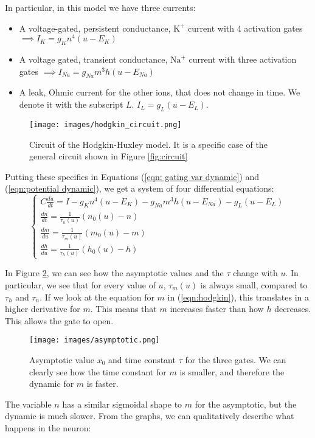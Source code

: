 \documentclass[oneside]{book}
\theoremstyle{definition}
\theoremstyle{plain}
\begin{document}
In particular, in this model we have three currents:
\begin{itemize}
    \item A voltage-gated, persistent conductance, $\mathrm{K}^+$ current with 4 activation gates $\implies I_K= g_K n^4 (u-E_K)$
    \item A voltage gated, transient conductance, $\mathrm{Na}^+$ current with three activation gates 
    $\implies I_{Na} =g_{Na}m^3h(u-E_{Na})$
    \item A leak, Ohmic current for the other ions, that does not change in time. We denote it with the subscript $L$. $I_L=g_L(u-E_L)$.
\end{itemize}
\begin{figure}
    \centering
    \texttt{[image: images/hodgkin\_circuit.png]}
    \caption{Circuit of the Hodgkin-Huxley model. It is a specific case of the general circuit shown in Figure \ref{fig:circuit}}
    \label{fig:hodgkin-circuit}
\end{figure}
Putting these specifics in Equations (\ref{eqn: gating var dynamic}) and (\ref{eqn:potential dynamic}), we get a system of four differential equations:
\begin{equation}\label{eqn:hodgkin}
    \begin{cases}
        C \frac{du}{dt} = I- g_{K}n^4(u- E_K) -g_{Na} m^3 h(u-E_{Na})- g_L(u-E_L) \\
        \frac{dn}{dt} = \frac{1}{\tau_n(u)} (n_0(u)- n)\\
        \frac{dm}{du} =\frac{1}{\tau_m({u})}(m_0(u) - m)\\
        \frac{dh}{du} =\frac{1}{\tau_{h}(u)}(h_0(u)-h)
    \end{cases}
\end{equation}

In Figure \ref{fig:asymptotic}, we can see how the asymptotic values and the $\tau$ change with $u$. In particular, we see that for every value of $u$, $\tau_m(u)$ is always small, compared to $\tau_h$ and $\tau_n$. If we look at the equation for $m$ in (\ref{eqn:hodgkin}), this translates in a higher derivative for $m$. This means that $m$ increases faster than how $h$ decreases. This allows the gate to open.
\begin{figure}
    \centering
    \texttt{[image: images/asymptotic.png]}
    \caption{Asymptotic value $x_0$ and time constant $\tau$ for the three gates. We can clearly see how the time constant for $m$ is smaller, and therefore the dynamic for $m$ is faster.}
    \label{fig:asymptotic}
\end{figure}
The variable $n$ has a similar sigmoidal shape to $m$ for the asymptotic, but the dynamic is much slower.
From the graphs, we can qualitatively describe what happens in the neuron:
\end{document}
